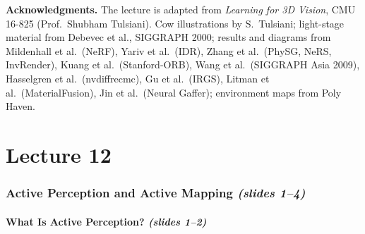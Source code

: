 \documentclass[11pt,a4paper]{article}
\theoremstyle{definition}
\theoremstyle{plain}
\theoremstyle{remark}
\begin{document}
\bigskip
\begin{small}
\textbf{Acknowledgments.} The lecture is adapted from \emph{Learning for 3D Vision}, CMU 16-825 (Prof.\ Shubham Tulsiani). Cow illustrations by S.~Tulsiani; light-stage material from Debevec et al., SIGGRAPH 2000; results and diagrams from Mildenhall et al.\ (NeRF), Yariv et al.\ (IDR), Zhang et al.\ (PhySG, NeRS, InvRender), Kuang et al.\ (Stanford-ORB), Wang et al.\ (SIGGRAPH Asia 2009), Hasselgren et al.\ (nvdiffrecmc), Gu et al.\ (IRGS), Litman et al.\ (MaterialFusion), Jin et al.\ (Neural Gaffer); environment maps from Poly Haven.
\end{small}

\newpage

\setcounter{section}{0}
\renewcommand{\thesection}{\arabic{section}}
\part{Lecture 12}

\begin{abstract}
\noindent These lecture notes provide a rigorous and self-contained mathematical and algorithmic treatment of \textbf{Lecture 12: Gaussian-Based Active Planning} from the \emph{Foundations of Spatial AI (2026/27)} course. We trace the transition from passive scene reconstruction to active perception and Next-Best-Pose planning, examine how \textbf{3D Gaussian Splatting (3DGS)} acts as a fast differentiable rendering engine for scoring candidate camera trajectories, analyze coverage-driven planning with \textbf{MAGICIAN}, and study a complete online semantic object-mapping architecture combining a 5\,cm voxel planning state with multi-channel Gaussian signal rendering and horizon-5 beam search.
\end{abstract}


\newpage

\section{Active Perception and Active Mapping \emph{(slides 1--4)}}

\subsection{What Is Active Perception? \emph{(slides 1--2)}}
\end{document}
